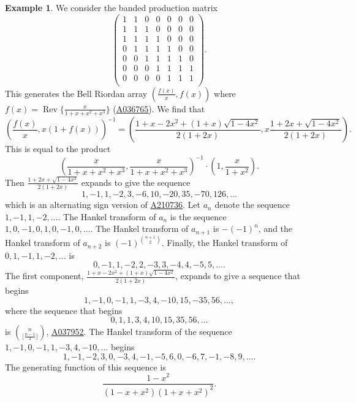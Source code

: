 \documentclass[12pt,reqno]{article}
\theoremstyle{definition}
\newtheorem{example}[theorem]{Example}
\DeclareMathOperator{\Rev}{Rev}
\newcommand{\seqnum}[1]{\href{http://oeis.org/#1}{\underline{#1}}}
\begin{document}
\begin{example}
We consider the banded production matrix
$$\left(
\begin{array}{ccccccc}
1 & 1 & 0 & 0 & 0 & 0 & 0 \\
1 & 1 & 1 & 0 & 0 & 0 & 0 \\
1 & 1 & 1 & 1 & 0 & 0 & 0 \\
0 & 1 & 1 & 1 & 1 & 0 & 0 \\
0 & 0 & 1 & 1 & 1 & 1 & 0 \\
0 & 0 & 0 & 1 & 1 & 1 & 1 \\
0 & 0 & 0 & 0 & 1 & 1 & 1 \\
\end{array}\right).$$ This generates the Bell Riordan array
$\left(\frac{f(x)}{x}, f(x)\right)$ where $f(x)=\Rev\{\frac{x}{1+x+x^2+x^3}\}$ (\seqnum{A036765}). We find that
$$\left(\frac{f(x)}{x}, x(1+f(x))\right)^{-1}=\left(\frac{1+x-2x^2+(1+x)\sqrt{1-4x^2}}{2(1+2x)}, x\frac{1+2x+\sqrt{1-4x^2}}{2(1+2x)}\right).$$ This is equal to the product 
$$\left(\frac{x}{1+x+x^2+x^3}, \frac{x}{1+x+x^2+x^3}\right)^{-1} \cdot \left(1,\frac{x}{1+x^2}\right).$$ 
Then $\frac{1+2x+\sqrt{1-4x^2}}{2(1+2x)}$ expands to give the sequence
$$1, -1, 1, -2, 3, -6, 10, -20, 35, -70, 126,\ldots$$ which is an alternating sign version of \seqnum{A210736}. Let $a_n$ denote the sequence $1,-1,1,-2,\ldots$. The Hankel transform of $a_n$ is the sequence $1,0,-1,0,1,0,-1,0,\ldots$. The Hankel transform of $a_{n+1}$ is $-(-1)^n$, and the Hankel transform of $a_{n+2}$ is $(-1)^{\binom{n+1}{2}}$. Finally, the Hankel transform of $0,1,-1,1,-2,\ldots$ is
$$0, -1, 1, -2, 2, -3, 3, -4, 4, -5, 5,\ldots.$$
The first component, $\frac{1+x-2x^2+(1+x)\sqrt{1-4x^2}}{2(1+2x)}$, expands to give a sequence that begins
$$1, -1, 0, -1, 1, -3, 4, -10, 15, -35, 56,\ldots,$$ where the sequence that begins
$$ 0,1, 1, 3, 4, 10, 15, 35, 56,\ldots$$ is $\binom{n}{\lfloor \frac{n-1}{2} \rfloor}$, \seqnum{A037952}. The Hankel transform of the sequence $1, -1, 0, -1, 1, -3, 4, -10,\ldots$ begins
$$1, -1, -2, 3, 0, -3, 4, -1, -5, 6, 0, -6, 7, -1, -8, 9,\ldots.$$ The generating function of this sequence is
$$\frac{1-x^2}{(1-x+x^2)(1+x+x^2)^2}.$$
\end{example}
\end{document}
